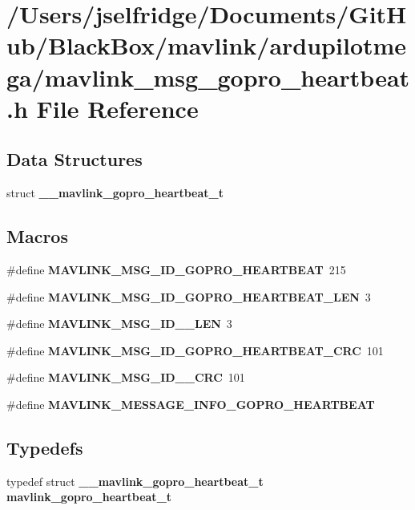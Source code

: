 \section{/\+Users/jselfridge/\+Documents/\+Git\+Hub/\+Black\+Box/mavlink/ardupilotmega/mavlink\+\_\+msg\+\_\+gopro\+\_\+heartbeat.h File Reference}
\label{mavlink__msg__gopro__heartbeat_8h}
\subsection*{Data Structures}
\begin{DoxyCompactItemize}
\item 
struct \textbf{ \+\_\+\+\_\+mavlink\+\_\+gopro\+\_\+heartbeat\+\_\+t}
\end{DoxyCompactItemize}
\subsection*{Macros}
\begin{DoxyCompactItemize}
\item 
\#define \textbf{ M\+A\+V\+L\+I\+N\+K\+\_\+\+M\+S\+G\+\_\+\+I\+D\+\_\+\+G\+O\+P\+R\+O\+\_\+\+H\+E\+A\+R\+T\+B\+E\+AT}~215
\item 
\#define \textbf{ M\+A\+V\+L\+I\+N\+K\+\_\+\+M\+S\+G\+\_\+\+I\+D\+\_\+\+G\+O\+P\+R\+O\+\_\+\+H\+E\+A\+R\+T\+B\+E\+A\+T\+\_\+\+L\+EN}~3
\item 
\#define \textbf{ M\+A\+V\+L\+I\+N\+K\+\_\+\+M\+S\+G\+\_\+\+I\+D\+\_\+\_\+\+L\+EN}~3
\item 
\#define \textbf{ M\+A\+V\+L\+I\+N\+K\+\_\+\+M\+S\+G\+\_\+\+I\+D\+\_\+\+G\+O\+P\+R\+O\+\_\+\+H\+E\+A\+R\+T\+B\+E\+A\+T\+\_\+\+C\+RC}~101
\item 
\#define \textbf{ M\+A\+V\+L\+I\+N\+K\+\_\+\+M\+S\+G\+\_\+\+I\+D\+\_\+\_\+\+C\+RC}~101
\item 
\#define \textbf{ M\+A\+V\+L\+I\+N\+K\+\_\+\+M\+E\+S\+S\+A\+G\+E\+\_\+\+I\+N\+F\+O\+\_\+\+G\+O\+P\+R\+O\+\_\+\+H\+E\+A\+R\+T\+B\+E\+AT}
\end{DoxyCompactItemize}
\subsection*{Typedefs}
\begin{DoxyCompactItemize}
\item 
typedef struct \textbf{ \+\_\+\+\_\+mavlink\+\_\+gopro\+\_\+heartbeat\+\_\+t} \textbf{ mavlink\+\_\+gopro\+\_\+heartbeat\+\_\+t}
\end{DoxyCompactItemize}


